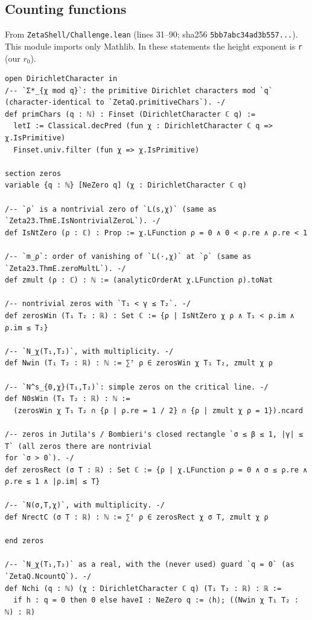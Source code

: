 \subsection{Counting functions}
From \texttt{ZetaShell/Challenge.lean} (lines 31--90; sha256 \texttt{5bb7abc34ad3b557...}). This module imports only Mathlib. In these statements the height exponent is \texttt{r}
(our $r_0$).
\begin{Verbatim}[fontsize=\footnotesize,breaklines,frame=single,framesep=2mm]
open DirichletCharacter in
/-- `Σ*_{χ mod q}`: the primitive Dirichlet characters mod `q` (character-identical to `ZetaQ.primitiveChars`). -/
def primChars (q : ℕ) : Finset (DirichletCharacter ℂ q) :=
  letI := Classical.decPred (fun χ : DirichletCharacter ℂ q => χ.IsPrimitive)
  Finset.univ.filter (fun χ => χ.IsPrimitive)

section zeros
variable {q : ℕ} [NeZero q] (χ : DirichletCharacter ℂ q)

/-- `ρ` is a nontrivial zero of `L(s,χ)` (same as `Zeta23.ThmE.IsNontrivialZeroL`). -/
def IsNtZero (ρ : ℂ) : Prop := χ.LFunction ρ = 0 ∧ 0 < ρ.re ∧ ρ.re < 1

/-- `m_ρ`: order of vanishing of `L(·,χ)` at `ρ` (same as `Zeta23.ThmE.zeroMultL`). -/
def zmult (ρ : ℂ) : ℕ := (analyticOrderAt χ.LFunction ρ).toNat

/-- nontrivial zeros with `T₁ < γ ≤ T₂`. -/
def zerosWin (T₁ T₂ : ℝ) : Set ℂ := {ρ | IsNtZero χ ρ ∧ T₁ < ρ.im ∧ ρ.im ≤ T₂}

/-- `N_χ(T₁,T₂)`, with multiplicity. -/
def Nwin (T₁ T₂ : ℝ) : ℕ := ∑ᶠ ρ ∈ zerosWin χ T₁ T₂, zmult χ ρ

/-- `N^s_{0,χ}(T₁,T₂)`: simple zeros on the critical line. -/
def N0sWin (T₁ T₂ : ℝ) : ℕ :=
  (zerosWin χ T₁ T₂ ∩ {ρ | ρ.re = 1 / 2} ∩ {ρ | zmult χ ρ = 1}).ncard

/-- zeros in Jutila's / Bombieri's closed rectangle `σ ≤ β ≤ 1, |γ| ≤ T` (all zeros there are nontrivial
for `σ > 0`). -/
def zerosRect (σ T : ℝ) : Set ℂ := {ρ | χ.LFunction ρ = 0 ∧ σ ≤ ρ.re ∧ ρ.re ≤ 1 ∧ |ρ.im| ≤ T}

/-- `N(σ,T,χ)`, with multiplicity. -/
def NrectC (σ T : ℝ) : ℕ := ∑ᶠ ρ ∈ zerosRect χ σ T, zmult χ ρ

end zeros

/-- `N_χ(T₁,T₂)` as a real, with the (never used) guard `q = 0` (as `ZetaQ.NcountQ`). -/
def Nchi (q : ℕ) (χ : DirichletCharacter ℂ q) (T₁ T₂ : ℝ) : ℝ :=
  if h : q = 0 then 0 else haveI : NeZero q := ⟨h⟩; ((Nwin χ T₁ T₂ : ℕ) : ℝ)


\end{Verbatim}
